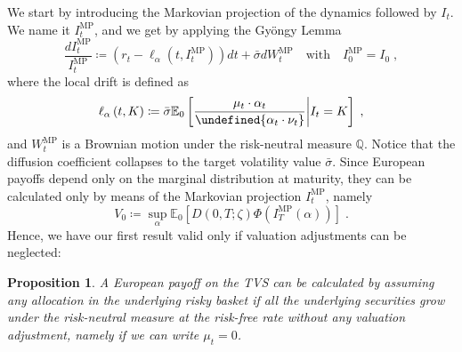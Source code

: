 \documentclass[11pt]{article}
\newtheorem{proposition}[theorem]{Proposition}
\let\norm\undefined %
\DeclarePairedDelimiter\norm{\lVert}{\rVert}
\begin{document}
We start by introducing the Markovian projection of the dynamics followed by $I_t$. We name it $I_t^{\text{MP}}$, and we get by applying the Gy\"ongy Lemma \citep{Gyongy1986}
\begin{equation}
    \frac{dI_t^{\text{MP}}}{I_t^{\text{MP}}} \coloneqq \left(r_t - \ell_{\alpha} \left(t,I_t^{\text{MP}}\right)\right)dt + \bar{\sigma}dW_t^{\text{MP}} \quad \text{with} \quad I_0^\text{MP} = I_0 \; ,
\label{eq:markovian_projection}\end{equation}
where the local drift is defined as
\begin{equation}
    \ell_\alpha \left(t,K\right) \coloneqq \bar{\sigma} \mathbb{E}_0\left[\frac{\mu_t \cdot \alpha_t}{\norm{\alpha_t \cdot \nu_t }}\bigg|I_t = K\right] \; ,
\label{eq:local_drift}\end{equation}
and $W_t^{\text{MP}}$ is a Brownian motion under the risk-neutral measure $\mathbb{Q}$. Notice that the diffusion coefficient collapses to the target volatility value $\bar{\sigma}$. Since European payoffs depend only on the marginal distribution at maturity, they can be calculated only by means of the Markovian projection $I_t^{\text{MP}}$, namely
\begin{equation}
V_0 \coloneqq \sup_{\alpha} \mathbb{E}_0\left[D\left(0,T;\zeta\right)\Phi\left(I_T^{\text{MP}}\left(\alpha\right)\right)\right] \; .
\end{equation}
Hence, we have our first result valid only if valuation adjustments can be neglected:
\begin{proposition}
A European payoff on the TVS can be calculated by assuming any allocation in the underlying risky basket if all the underlying
securities grow under the risk-neutral measure at the risk-free rate without any valuation adjustment, namely if we can write $\mu_t=0$.
\end{proposition}
\end{document}
